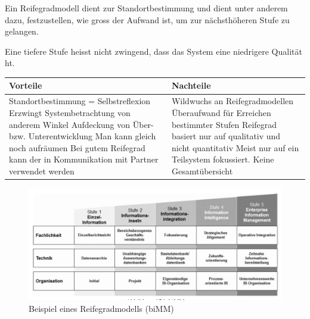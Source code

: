 \documentclass[a4paper, 11pt, nofootinbib]{article}
\renewcommand*{\thead}[1]{\bfseries #1}
\newcommand \tabitem{\makebox[1em][r]{\textbullet~}}
\begin{document}
Ein Reifegradmodell dient zur Standortbestimmung und dient unter anderem dazu, festzustellen, wie gross der Aufwand ist, um zur nächsthöheren Stufe zu gelangen.

Eine tiefere Stufe heisst nicht zwingend, dass das System eine niedrigere Qualität ht.

\vspace{10px}

\begin{tabular}{|p{7cm}|p{7cm}|}
	\hline
	\thead{Vorteile} & \thead{Nachteile}\\
	\hline
	\tabitem Standortbestimmung = Selbstreflexion \newline
	\tabitem Erzwingt Systembetrachtung von anderem Winkel \newline
	\tabitem Aufdeckung von Über- bzw. Unterentwicklung \newline
	\tabitem Man kann gleich noch aufräumen \newline
	\tabitem Bei gutem Reifegrad kann der in Kommunikation mit Partner verwendet werden & 
	\tabitem Wildwuchs an Reifegradmodellen \newline
	\tabitem Überaufwand für Erreichen bestimmter Stufen \newline
	\tabitem Reifegrad basiert nur auf qualitativ und nicht quantitativ \newline
	\tabitem Meist nur auf ein Teilsystem fokussiert. Keine Gesamtübersicht
	\\
	\hline
\end{tabular}

\begin{figure}[htb]
	\centering
	\includegraphics[keepaspectratio=true,height=10\baselineskip]{reifegrad_bimm.PNG}
	\caption{Beispiel eines Reifegradmodells (biMM)}
	\label{fig:bimm}
\end{figure}
\end{document}
